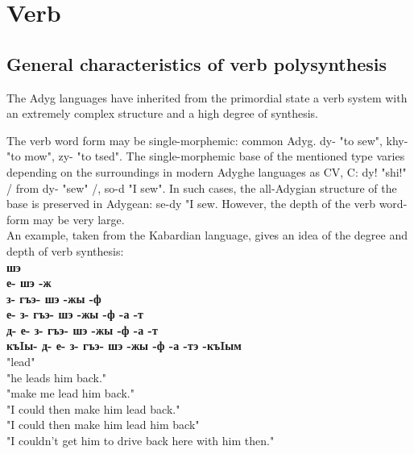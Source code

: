 \documentclass[a4paper,12pt]{book}
\newcommand{\1}[1]{\textbf{\emph{#1}}} %
\newcommand{\2}[1]{\textbf{[#1]}} %
\newcommand{\3}[1]{\fontsize{11pt}{0cm}\textbf{\emph{#1}}} %
\newcommand{\4}[1]{\fontsize{10pt}{0cm}\emph{#1}}	%
\newcommand{\5}[1]{\textbf{/#1/}} %
\newcommand{\6}[1]{\textbf{[#1]}} %
\newcommand{\7}[1]{\fontsize{12pt}{0cm}\emph{#1}} %
\newcommand{\8}[1]{\fontsize{12pt}{0cm}`#1'} %
\newcommand{\9}[1]{\fontsize{12pt}{0cm}(lit. `#1')} %
\begin{document}
\section{Verb}
\subsection{General characteristics of verb polysynthesis}
The Adyg languages have inherited from the primordial state a verb system with an extremely complex structure and a high degree of synthesis.

The verb word form may be single-morphemic: common Adyg. dy- "to sew", khy- "to mow", zy- "to tsed". The single-morphemic base of the mentioned type varies depending on the surroundings in modern Adyghe languages as CV, C: dy! "shi!" / from dy- "sew" /, so-d "I sew". In such cases, the all-Adygian structure of the base is preserved in Adygean: se-dy "I sew. However, the depth of the verb word-form may be very large.\\
An example, taken from the Kabardian language, gives an idea of the degree and depth of verb synthesis:\\
\textbf{шэ}\\
\textbf{е- шэ -ж}\\
\textbf{з- гъэ- шэ -жы -ф}\\
\textbf{е- з- гъэ- шэ -жы -ф -а -т}\\
\textbf{д- е- з- гъэ- шэ -жы -ф -а -т}\\
\textbf{къIы- д- е- з- гъэ- шэ -жы -ф -а -тэ -къIым}\\
"lead"\\
"he leads him back."\\
"make me lead him back."\\
"I could then make him lead back."\\
"I could then make him lead him back"\\
"I couldn't get him to drive back here with him then."\\
\end{document}
